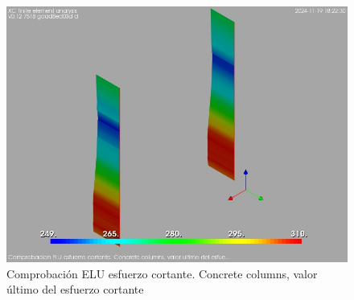\begin{figure}[ht]
\begin{center}
\includegraphics[width=\linewidth]{results/graphics/shearULS/columnZconcrVu}
\caption{Comprobación ELU esfuerzo cortante. Concrete columns, valor último del esfuerzo cortante}
\label{ULS_shearResistancecolumnZconcrVu}
\end{center}
\end{figure}
